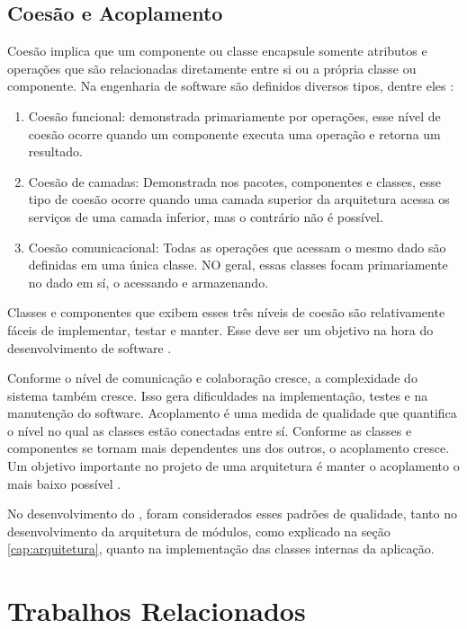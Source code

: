 \documentclass[12pt]{tcc}
\begin{document}
	\section{Coesão e Acoplamento}
	\label{section:coesao-e-acoplamento}

	Coesão implica que um componente ou classe encapsule somente atributos e operações que são relacionadas diretamente entre si ou a própria classe ou componente. Na engenharia de software são definidos diversos tipos, dentre eles \citep{pressman2009software}:

	\begin{enumerate}
		\item Coesão funcional: demonstrada primariamente por operações, esse nível de coesão ocorre quando um componente executa uma operação e retorna um resultado.
		\item Coesão de camadas: Demonstrada nos pacotes, componentes e classes, esse tipo de coesão ocorre quando uma camada superior da arquitetura acessa os serviços de uma camada inferior, mas o contrário não é possível.
		\item Coesão comunicacional: Todas as operações que acessam o mesmo dado são definidas em uma única classe. NO geral, essas classes focam primariamente no dado em sí, o acessando e armazenando.
	\end{enumerate}

	Classes e componentes que exibem esses três níveis de coesão são relativamente fáceis de implementar, testar e manter. Esse deve ser um objetivo na hora do desenvolvimento de software \citep{pressman2009software}.
	
	Conforme o nível de comunicação e colaboração cresce, a complexidade do sistema também cresce. Isso gera dificuldades na implementação, testes e na manutenção do software. Acoplamento é uma medida de qualidade que quantifica o nível no qual as classes estão conectadas entre sí. Conforme as classes e componentes se tornam mais dependentes uns dos outros, o acoplamento cresce. Um objetivo importante no projeto de uma arquitetura é manter o acoplamento o mais baixo possível \citep{pressman2009software}.

	No desenvolvimento do , foram considerados esses padrões de qualidade, tanto no desenvolvimento da arquitetura de módulos, como explicado na seção \ref{cap:arquitetura}, quanto na implementação das classes internas da aplicação.

\chapter{Trabalhos Relacionados}
\label{cap:metodologiatrabsrelacionados}
\end{document}
